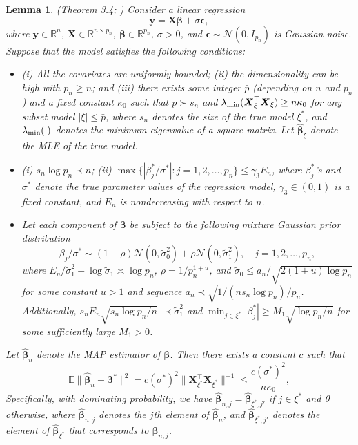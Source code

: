 \documentclass[11pt]{article}
\newcommand{\bX}{{\boldsymbol X}}
\newcommand{\by}{{\boldsymbol y}}
\newcommand{\bbeta}{{\boldsymbol \beta}}
\newcommand{\bepsilon}{{\boldsymbol \epsilon}}
\newtheorem{lemma}{Lemma}[section]
\begin{document}
\begin{lemma} \label{lemma:linearR}
(Theorem 3.4; \cite{SongLiang2021Nearly}) Consider a linear regression 
\[
\by=\bX \bbeta+\sigma \bepsilon,
\]
 where $\by \in \mathbb{R}^n$, $\bX\in \mathbb{R}^{n\times p_n}$, $\bbeta\in \mathbb{R}^{p_n}$, 
 $\sigma>0$, and $\bepsilon \sim \mathcal{N}(0,I_{p_n})$ is Gaussian noise.  
 Suppose that the model satisfies the following conditions: 
 \begin{itemize} 
 \item[(A1)] (i) All the covariates are uniformly bounded; (ii) the dimensionality can be high with $p_n \geq n$; and (iii) there exists some integer $\bar{p}$ (depending on $n$ and $p_n$) and a fixed constant $\kappa_{0}$ such that $\bar{p} \succ s_n$  and 
 $\lambda_{\rm \min}(\bX_{\xi}^{\top} \bX_{\xi}) \geq n \kappa_{0}$ for any subset model 
  $|\xi| \leq \bar{p}$, where $s_n$ denotes the size of the  true model $\xi^*$, 
   and $\lambda_{\rm \min}(\cdot)$ denotes the minimum eigenvalue of a square matrix. Let $\hat{\bbeta}_{\xi}$ denote the MLE of the true model. 
   
  \item[(A2)] (i) $s_n \log p_n \prec n$; (ii) $\max\{ |\beta_j^*/\sigma^*|: j=1,2,\ldots,p_n \} \leq \gamma_3 E_n$, where  $\beta_j^*$'s and $\sigma^*$ denote the 
  true parameter values of the regression model,  $\gamma_3 \in (0,1)$ is a fixed constant,  and $E_n$ is nondecreasing with respect to $n$. 

 \item[(A3)] Let each component of $\bbeta$ be subject to the following mixture Gaussian prior distribution 
 \[
 \beta_j/\sigma^* \sim (1-\rho) \mathcal{N}(0, \tilde{\sigma}_0^2)+ \rho \mathcal{N}(0,\tilde{\sigma}_1^2), \quad j=1,2,\ldots, p_n, 
 \]
 where $E_n/\tilde{\sigma}_1^2+\log \tilde{\sigma}_1 \asymp \log p_n$, 
 $\rho=1/p_n^{1+u}$, and $\tilde{\sigma}_0 \leq a_n/\sqrt{2(1+u) \log p_n}$ 
  for some constant $u>1$ and sequence $a_n \prec \sqrt{1/(n s_n \log p_n)}/p_n$.   
 Additionally, $s_n E_n \sqrt{s_n \log p_n/n}$  $\prec \tilde{\sigma}_1^2$ and 
 $\min_{j \in \xi^*} |\beta_j^*| \geq M_1 \sqrt{\log p_n/n}$ for some sufficiently large 
 $M_1>0$. 
 \end{itemize} 
 Let $\hat{\bbeta}_n$ denote the MAP 
 estimator of $\bbeta$. Then there exists a constant $c$ such that 
 \[
  \mathbb{E} \|\hat{\bbeta}_n-\bbeta^*\|^2 =c (\sigma^*)^2 \|\bX_{\xi^*}^{\top} \bX_{\xi^*}\|^{-1} 
  \leq \frac{c (\sigma^*)^2}{n \kappa_{0}},
 \]
Specifically, with dominating probability, we have $\hat{\bbeta}_{n,j}=\hat{\bbeta}_{\xi^*,j'}$ if $j\in \xi^*$ and 0 otherwise, where $\hat{\bbeta}_{n,j}$ denotes the $j$th element of $\hat{\bbeta}_n$, and   $\hat{\bbeta}_{\xi^*,j'}$ denotes the element 
 of $\hat{\bbeta}_{\xi^*}$ that  corresponds to 
 $\bbeta_{n,j}$.
 \end{lemma}
\end{document}
